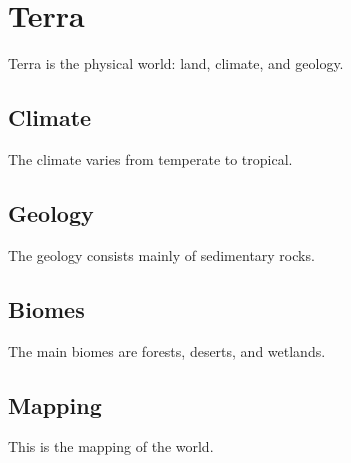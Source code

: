 \section*{Terra}

Terra is the physical world: land, climate, and geology.

\subsection*{Climate}

The climate varies from temperate to tropical.

\subsection*{Geology}

The geology consists mainly of sedimentary rocks.

\subsection*{Biomes}

The main biomes are forests, deserts, and wetlands.

\subsection*{Mapping}

This is the mapping of the world.
